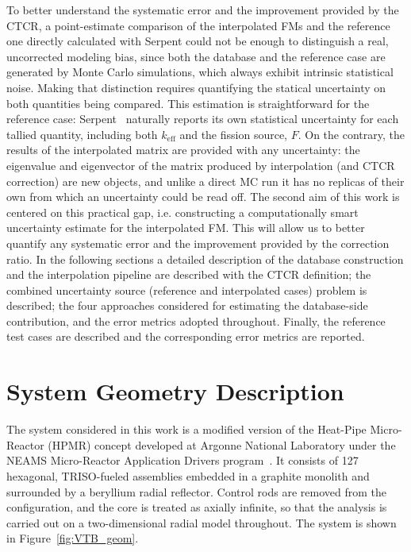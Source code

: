 \documentclass{style/nseJournal}
\begin{document}
To better understand the systematic error and the improvement provided by the CTCR, a point-estimate comparison of the interpolated FMs and the reference one directly calculated with Serpent could not be enough to distinguish a real, uncorrected modeling bias, since both the database and the reference case are generated by Monte Carlo simulations, which always exhibit intrinsic statistical noise. Making that distinction requires quantifying the statical uncertainty on both quantities being compared. This estimation is straightforward for the reference case: Serpent~\cite{LeppanenEPJN2025} naturally reports its own statistical uncertainty for each tallied quantity, including both $k_{\text{eff}}$ and the fission source, $F$. On the contrary, the results of the interpolated matrix are provided with any uncertainty: the eigenvalue and eigenvector of the matrix produced by interpolation (and CTCR correction) are new objects, and unlike a direct MC run it has no replicas of their own from which an uncertainty could be read off. The second aim of this work is centered on this practical gap, i.e. constructing a computationally smart uncertainty estimate for the interpolated FM. This will allow us to better quantify any systematic error and the improvement provided by the correction ratio.  
In the following sections a detailed description of the database construction and the interpolation pipeline are described with the CTCR definition; the combined uncertainty source (reference and interpolated cases) problem is described; the four approaches considered for estimating the database-side contribution, and the error metrics adopted throughout. Finally, the reference test cases are described and the corresponding error metrics are reported.


\section{System Geometry Description}
\label{sec:geometry}
The system considered in this work is a modified version of the Heat-Pipe Micro-Reactor (HPMR) concept developed at Argonne National Laboratory under the NEAMS Micro-Reactor Application Drivers program~\cite{StauffNSE2024}. It consists of 127 hexagonal, TRISO-fueled assemblies embedded in a graphite monolith and surrounded by a beryllium radial reflector. Control rods are removed from the configuration, and the core is treated as axially infinite, so that the analysis is carried out on a two-dimensional radial model throughout. The system is shown in Figure~\ref{fig:VTB_geom}. 
\end{document}
